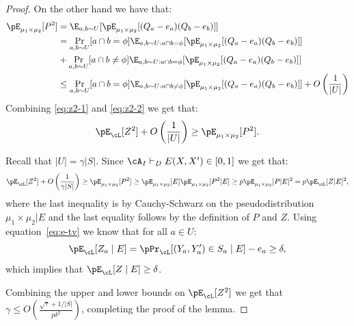 \begin{proof}
On the other hand we have that:
\begin{align}
\pE_{\mu_1 \times \mu_2}[P^2] &= \E_{a,b \sim U}[\pE_{\mu_1 \times \mu_2}[(Q_a - e_a)(Q_b - e_b)]] \notag \\
&= \Pr_{a,b \sim U}[a \cap b = \phi]\E_{a,b \sim U: a\cap b=\phi}[\pE_{\mu_1 \times \mu_2}[(Q_{a} - e_a)(Q_b - e_b)]] \notag \\
&+\Pr_{a,b \sim U}[a \cap b \neq \phi]\E_{a,b \sim U: a\cap b=\phi}[\pE_{\mu_1 \times \mu_2}[(Q_{a} - e_a)(Q_b - e_b)]] \notag \\
&\leq \Pr_{a,b \sim U}[a \cap b = \phi]\E_{a,b \sim U: a\cap b\neq\phi}[\pE_{\mu_1 \times \mu_2}[(Q_{a} - e_a)(Q_b - e_b)]] + O\left(\frac{1}{|U|}\right)\label{eq:z2-2}
\end{align}
Combining \eqref{eq:z2-1} and \eqref{eq:z2-2} we get that:
\[\pE_{\cL}[Z^2]+O\left(\frac{1}{|U|}\right) \geq \pE_{\mu_1 \times \mu_2}[P^2].\]

Recall that $|U| = \gamma |S|$. Since $\cA_I \vdash_{D} E(X,X') \in [0,1]$ we get that:
\[\pE_{\cL}[Z^2]+O\left(\frac{1}{\gamma|S|}\right)  \geq \pE_{\mu_1 \times \mu_2}[P^2] \geq \pE_{\mu_1 \times \mu_2}[E]\pE_{\mu_1 \times \mu_2}[P^2 | E] \geq p \pE_{\mu_1 \times \mu_2}[P | E]^2 = p\pE_{\cL}[Z | E]^2,\]
where the last inequality is by Cauchy-Schwarz on the pseudodistribution $\mu_1 \times \mu_2 | E$ and the last equality follows by the definition of $P$ and $Z$. Using equation~\eqref{eq:e-tv} we know that for all $a \in U$:
\[\pE_{\cL}[Z_a \mid E] = \pPr_{\cL}[(Y_a,Y'_a) \in S_a \mid E] - e_a  \geq \delta,\]
which implies that $\pE_{\cL}[Z \mid E] \geq \delta$.

Combining the upper and lower bounds on $\pE_{\cL}[Z^2]$ we get that $\gamma \leq O\left(\frac{\sqrt{\tau}+ 1/|S|}{p\delta^2}\right)$,
completing the proof of the lemma.







\end{proof}




